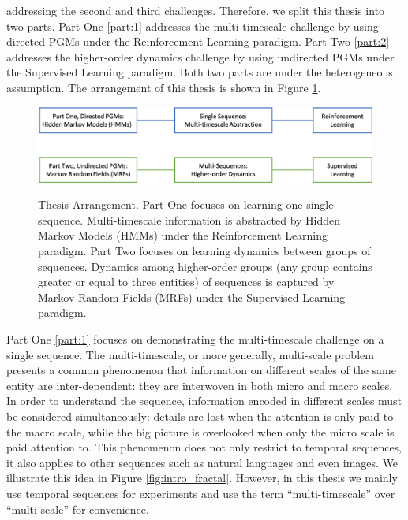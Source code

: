 addressing the second and third challenges. Therefore, we split
this thesis into two parts. Part One \ref{part:1} addresses the
multi-timescale challenge by using directed PGMs under the
Reinforcement Learning paradigm. Part Two \ref{part:2} addresses
the higher-order dynamics challenge by using undirected PGMs
under the Supervised Learning paradigm. Both two parts are under
the heterogeneous assumption. The arrangement of this thesis is
shown in Figure \ref{fig:intro_content}.
\begin{figure}[h]
  \centering
  \includegraphics[width=1\linewidth]{figures/content.png}\\
  \caption{\label{fig:intro_content} Thesis Arrangement. Part One
    focuses on learning one single sequence. Multi-timescale
    information is abstracted by Hidden Markov Models (HMMs)
    under the Reinforcement Learning paradigm. Part Two focuses
    on learning dynamics between groups of sequences. Dynamics
    among higher-order groups (any group contains greater or
    equal to three entities) of sequences is captured by Markov
    Random Fields (MRFs) under the Supervised Learning paradigm.}
\end{figure}

Part One \ref{part:1} focuses on demonstrating the
multi-timescale challenge \cite{mandelbrot1997multifractal} on a
single sequence. The multi-timescale, or more generally,
multi-scale problem presents a common phenomenon that information
on different scales of the same entity are inter-dependent: they
are interwoven in both micro and macro scales. In order to
understand the sequence, information encoded in different scales
must be considered simultaneously: details are lost when the
attention is only paid to the macro scale, while the big picture
is overlooked when only the micro scale is paid attention to.
This phenomenon does not only restrict to temporal sequences, it
also applies to other sequences such as natural languages and
even images. We illustrate this idea in Figure
\ref{fig:intro_fractal}. However, in this thesis we mainly use
temporal sequences for experiments and use the term
``multi-timescale'' over ``multi-scale'' for convenience.


